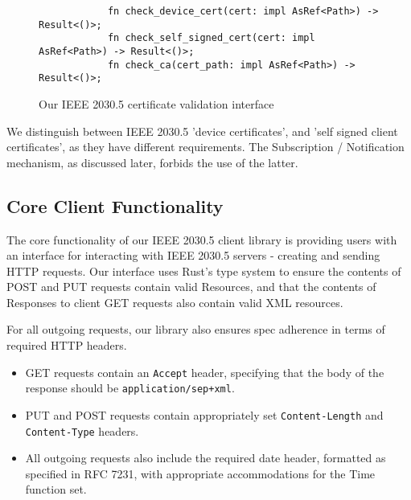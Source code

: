 \begin{figure}[h]
    \begin{center}
        \begin{lstlisting}
            fn check_device_cert(cert: impl AsRef<Path>) -> Result<()>;
            fn check_self_signed_cert(cert: impl AsRef<Path>) -> Result<()>;
            fn check_ca(cert_path: impl AsRef<Path>) -> Result<()>;
        \end{lstlisting}
        \label{fig:certvalidinterface}
        \vspace{-10pt}
        \caption{Our IEEE 2030.5 certificate validation interface}
    \end{center}
\end{figure}

We distinguish between IEEE 2030.5 'device certificates', and 'self signed client certificates', as they have different requirements. The Subscription / Notification mechanism, as discussed later, forbids the use of the latter.

\subsection{Core Client Functionality}
The core functionality of our IEEE 2030.5 client library is providing users with an interface for interacting with IEEE 2030.5 servers - creating and sending HTTP requests.
Our interface uses Rust's type system to ensure the contents of POST and PUT requests contain valid Resources, and that the contents of Responses to client GET requests also contain valid XML resources.

For all outgoing requests, our library also ensures spec adherence in terms of required HTTP headers. 

\begin{itemize}
    \item GET requests contain an \texttt{Accept} header, specifying that the body of the response should be \texttt{application/sep+xml}.
    \item PUT and POST requests contain appropriately set \texttt{Content-Length} and \texttt{Content-Type} headers.
    \item All outgoing requests also include the required date header, formatted as specified in RFC 7231, with appropriate accommodations for the Time function set. \cite{rfc7231}
\end{itemize}


